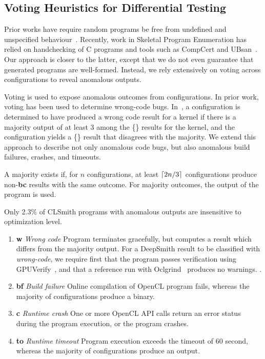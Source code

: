 \subsection{Voting Heuristics for Differential Testing}

Prior works have require random programs be free from undefined and unspecified behaviour~\cite{Yang2011c,Le2013a,Le2015}. Recently, work in Skeletal Program Enumeration has relied on handchecking of C programs and tools such as CompCert and UBsan~\cite{Zhang2017a}. Our approach is closer to the latter, except that we do not even guarantee that generated programs are well-formed. Instead, we rely extensively on voting across configurations to reveal anomalous outputs.

Voting is used to expose anomalous outcomes from configurations. In prior work, voting has been used to determine wrong-code bugs. In~\cite{Lidbury2015a}, a configuration is determined to have produced a wrong code result for a kernel if there is a majority output of at least 3 among the \{\cmark\} results for the kernel, and the configuration yields a \{\cmark\} result that disagrees with the majority. We extend this approach to describe not only anomalous code bugs, but also anomalous build failures, crashes, and timeouts.

A majority exists if, for $n$ configurations, at least $\lceil2n/3\rceil$ configurations produce non-\textbf{bc} results with the same outcome. For \cmark majority outcomes, the output of the program is used.

Only 2.3\% of CLSmith programs with anomalous outputs are insensitive to optimization level.

%
\begin{enumerate}
	\item \textbf{w} \emph{Wrong code} Program terminates gracefully, but computes a result which differs from the majority output. For a DeepSmith result to be classified with \emph{wrong-code}, we require first that the program passes verification using GPUVerify~\cite{Betts2012}, and that a reference run with Oclgrind~\cite{Price2015} produces no warnings. .
	\item \textbf{bf} \emph{Build failure} Online compilation of OpenCL program fails, whereas the majority of configurations produce a binary. 
	\item \textbf{c} \emph{Runtime crash} One or more OpenCL API calls return an error status during the program execution, or the program crashes.
	\item \textbf{to} \emph{Runtime timeout} Program execution exceeds the timeout of 60 second, whereas the majority of configurations produce an output.
\end{enumerate}


